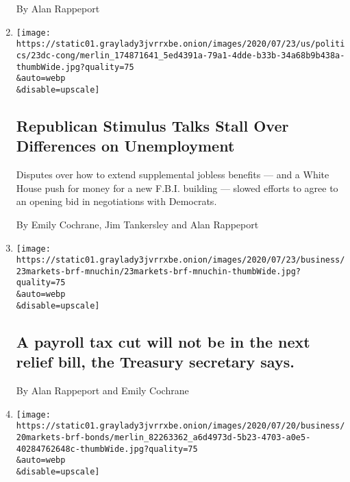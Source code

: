 \begin{enumerate}
  By Alan Rappeport
\item
  \href{/2020/07/23/us/politics/republicans-stimulus-coronavirus.html}{}

  \texttt{[image: https://static01.graylady3jvrrxbe.onion/images/2020/07/23/us/politics/23dc-cong/merlin\_174871641\_5ed4391a-79a1-4dde-b33b-34a68b9b438a-thumbWide.jpg?quality=75\\\&auto=webp\\\&disable=upscale]}

  \hypertarget{republican-stimulus-talks-stall-over-differences-on-unemployment}{%
  \subsection{Republican Stimulus Talks Stall Over Differences on
  Unemployment}\label{republican-stimulus-talks-stall-over-differences-on-unemployment}}

  Disputes over how to extend supplemental jobless benefits --- and a
  White House push for money for a new F.B.I. building --- slowed
  efforts to agree to an opening bid in negotiations with Democrats.

  By Emily Cochrane, Jim Tankersley and Alan Rappeport
\item
  \href{/live/2020/07/23/business/stock-market-today-coronavirus/a-payroll-tax-cut-will-not-be-in-the-next-relief-bill-the-treasury-secretary-says}{}

  \texttt{[image: https://static01.graylady3jvrrxbe.onion/images/2020/07/23/business/23markets-brf-mnuchin/23markets-brf-mnuchin-thumbWide.jpg?quality=75\\\&auto=webp\\\&disable=upscale]}

  \hypertarget{a-payroll-tax-cut-will-not-be-in-the-next-relief-bill-the-treasury-secretary-says}{%
  \subsection{A payroll tax cut will not be in the next relief bill, the
  Treasury secretary
  says.}\label{a-payroll-tax-cut-will-not-be-in-the-next-relief-bill-the-treasury-secretary-says}}

  By Alan Rappeport and Emily Cochrane
\item
  \href{/live/2020/07/20/business/stock-market-today-coronavirus/the-feds-bond-buying-program-draws-congressional-scrutiny}{}

  \texttt{[image: https://static01.graylady3jvrrxbe.onion/images/2020/07/20/business/20markets-brf-bonds/merlin\_82263362\_a6d4973d-5b23-4703-a0e5-40284762648c-thumbWide.jpg?quality=75\\\&auto=webp\\\&disable=upscale]}


\end{enumerate}

